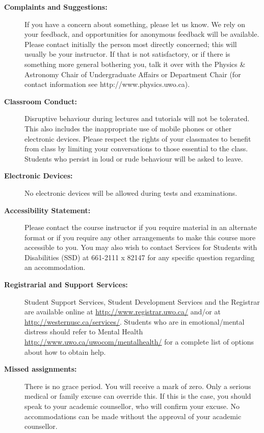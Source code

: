 \documentclass[12pt]{article}
\begin{document}
\begin{description}
\item[\bf Complaints and Suggestions:]
If you have a concern about something, please let us know. We rely on your feedback, and opportunities for anonymous feedback will be available. Please contact initially the person most directly concerned; this will usually be your instructor. If that is not satisfactory, or if there is something more general bothering you, talk it over with the Physics \& Astronomy Chair of Undergraduate Affairs or Department Chair (for contact information see http://www.physics.uwo.ca).

\item[\bf Classroom Conduct:]
Disruptive behaviour during lectures and tutorials will not be tolerated. This also includes the inappropriate use of mobile phones or other electronic devices. Please respect the rights of your classmates to benefit from class by limiting your conversations to those essential to the class. Students who persist in loud or rude behaviour will be asked to leave.

\item[\bf Electronic Devices:] No electronic devices will be allowed during tests and examinations.

\item[\bf Accessibility Statement:] Please contact the course instructor if you require material in an alternate format or if you require any other arrangements to make this course more accessible to you. You may also wish to contact Services for Students with Disabilities (SSD) at 661-2111 x 82147 for any specific question regarding an accommodation.

\item[\bf Registrarial and Support Services:] Student Support Services, Student Development Services and the Registrar are available online at 
\url{http://www.registrar.uwo.ca/} and/or at \url{http://westernusc.ca/services/}. Students who are in emotional/mental distress should refer to Mental Health\@Western 
\url{http://www.uwo.ca/uwocom/mentalhealth/} for a complete list of options about how to obtain help.

\item[\bf Missed assignments:] There is no grace period. You will receive a mark of zero. Only a serious medical or family excuse can override this. If this is the case, you should speak to your academic counsellor, who will confirm your excuse. No accommodations can be made without the approval of your academic counsellor.


\end{description}
\end{document}

